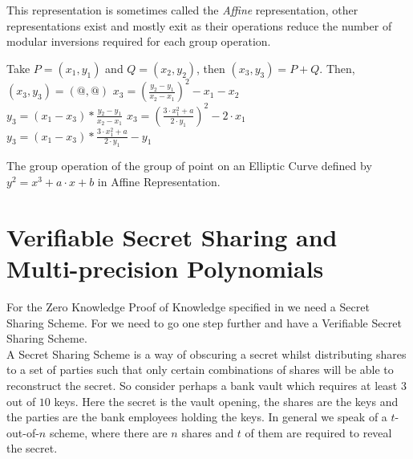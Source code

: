 \documentclass[ %
                    author={Nicholas Tutte},
                supervisor={Prof. Nigel Smart},
                    degree={MEng},
                     title={Secure Two Party Computation},
                  subtitle={A practical comparison of recent protocols},
                      type={Research - GG1K},
                      year={2015} ]{dissertation}
\begin{document}
			This representation is sometimes called the \emph{Affine} representation, other representations exist and mostly exit as their operations reduce the number of modular inversions required for each group operation.\\

			\begin{mdframed}
				\begin{algorithm}[H]
					Take $P = (x_1, y_1)$ and $Q = (x_2, y_2)$, then $(x_3, y_3) = P + Q$. Then,\\[0.15cm]
					{
						$(x_3, y_3) = (@, @)$
					}
					{
						{
							$x_3 = (\frac{y_2 - y_1}{x_2 - x_1})^2 - x_1 - x_2$\\
							$y_3 = (x_1 - x_3) * \frac{y_2 - y_1}{x_2 - x_1}$
						}
						{
							$x_3 = (\frac{3\cdot x_1^2 + a}{2 \cdot y_1}) ^ 2 - 2\cdot x_1$\\
							$y_3 = (x_1 - x_3) * \frac{3 \cdot x_1^2 + a}{2 \cdot y_1} - y_1$
						}
					}

					\caption{The group operation of the group of point on an Elliptic Curve defined by $y^2 = x^3 + a \cdot x + b$ in Affine Representation. \label{Algo:ECC_GroupOp}}
				\end{algorithm}
			\end{mdframed}

		\section{Verifiable Secret Sharing and Multi-precision Polynomials}

			For the Zero Knowledge Proof of Knowledge specified in \cite{LindellAndPinkas2011} we need a Secret Sharing Scheme. For \cite{Katz_Symm_CnC_2013} we need to go one step further and have a Verifiable Secret Sharing Scheme.\\

			A Secret Sharing Scheme is a way of obscuring a secret whilst distributing shares to a set of parties such that only certain combinations of shares will be able to reconstruct the secret. So consider perhaps a bank vault which requires at least $3$ out of $10$ keys. Here the secret is the vault opening, the shares are the keys and the parties are the bank employees holding the keys. In general we speak of a $t$-out-of-$n$ scheme, where there are $n$ shares and $t$ of them are required to reveal the secret.\\
\end{document}
